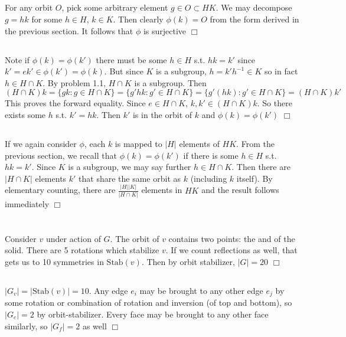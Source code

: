 \documentclass{article}
\begin{document}
\subsection{}
For any orbit $O$, pick some arbitrary element $g \in O \subset HK$. We may decompose $g = hk$ for some $h \in H$, $k \in K$. Then clearly $\phi(k) = O$ from the form derived in the previous section. It follows that $\phi$ is surjective $\Box$

\subsection{}
Note if $\phi(k) = \phi(k')$ there must be some $h \in H$ s.t. $hk = k'$ since $k' = ek' \in \phi(k') = \phi(k)$. But since $K$ is a subgroup, $h = k'h^{-1} \in K$ so in fact $h \in H \cap K$. By problem 1.1, $H \cap K$ is a subgroup. Then 
$$(H \cap K)k = \{gk : g \in H \cap K\} = \{g'hk : g' \in H \cap K\} = \{g'(hk) : g' \in H \cap K\} = (H \cap K)k'$$
This proves the forward equality. Since $e \in H \cap K$, $k,k' \in (H \cap K)k$. So there exists some $h$ s.t. $k' = hk$. Then $k'$ is in the orbit of $k$ and $\phi(k) = \phi(k')$ $\Box$

\subsection{}
If we again consider $\phi$, each $k$ is mapped to $|H|$ elements of $HK$. From the previous section, we recall that $\phi(k) = \phi(k')$ if there is some $h \in H$ s.t. $hk = k'$. Since $K$ is a subgroup, we may say further $h \in H \cap K$. Then there are $|H \cap K|$ elements $k'$ that share the same orbit as $k$ (including $k$ itself). By elementary counting, there are $\frac{|H||K|}{|H \cap K|}$ elements in $HK$ and the result follows immediately $\Box$

\section{}
\subsection{}
Consider $v$ under action of $G$. The orbit of $v$ contains two points: the  and  of the solid. There are 5 rotations which stabilize $v$. If we count reflections as well, that gets us to 10 symmetries in $\mathrm{Stab}(v)$. Then by orbit stabilizer, $|G| = 20$ $\Box$

\subsection{}
$|G_v| = |\mathrm{Stab}(v)| = 10$. Any edge $e_i$ may be brought to any other edge $e_j$ by some rotation or combination of rotation and inversion (of top and bottom), so $|G_e| = 2$ by orbit-stabilizer. Every face may be brought to any other face similarly, so $|G_f| = 2$ as well $\Box$
\end{document}
